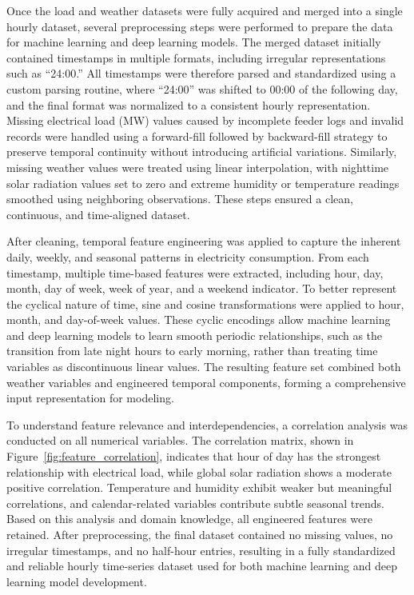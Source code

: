 \documentclass[oneside, 12pt]{book}
\numberwithin{equation}{chapter}
\begin{document}
Once the load and weather datasets were fully acquired and merged into a single hourly dataset, several preprocessing steps were performed to prepare the data for machine learning and deep learning models. The merged dataset initially contained timestamps in multiple formats, including irregular representations such as ``24:00.'' All timestamps were therefore parsed and standardized using a custom parsing routine, where ``24:00'' was shifted to 00:00 of the following day, and the final format was normalized to a consistent hourly representation. Missing electrical load (MW) values caused by incomplete feeder logs and invalid records were handled using a forward-fill followed by backward-fill strategy to preserve temporal continuity without introducing artificial variations. Similarly, missing weather values were treated using linear interpolation, with nighttime solar radiation values set to zero and extreme humidity or temperature readings smoothed using neighboring observations. These steps ensured a clean, continuous, and time-aligned dataset.

After cleaning, temporal feature engineering was applied to capture the inherent daily, weekly, and seasonal patterns in electricity consumption. From each timestamp, multiple time-based features were extracted, including hour, day, month, day of week, week of year, and a weekend indicator. To better represent the cyclical nature of time, sine and cosine transformations were applied to hour, month, and day-of-week values. These cyclic encodings allow machine learning and deep learning models to learn smooth periodic relationships, such as the transition from late night hours to early morning, rather than treating time variables as discontinuous linear values. The resulting feature set combined both weather variables and engineered temporal components, forming a comprehensive input representation for modeling.

To understand feature relevance and interdependencies, a correlation analysis was conducted on all numerical variables. The correlation matrix, shown in Figure~\ref{fig:feature_correlation}, indicates that hour of day has the strongest relationship with electrical load, while global solar radiation shows a moderate positive correlation. Temperature and humidity exhibit weaker but meaningful correlations, and calendar-related variables contribute subtle seasonal trends. Based on this analysis and domain knowledge, all engineered features were retained. After preprocessing, the final dataset contained no missing values, no irregular timestamps, and no half-hour entries, resulting in a fully standardized and reliable hourly time-series dataset used for both machine learning and deep learning model development.
\end{document}
